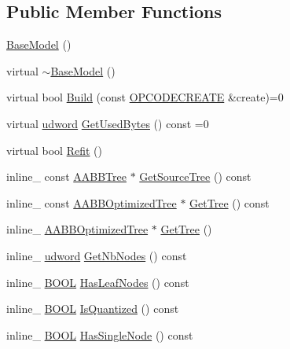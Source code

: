 \subsection*{Public Member Functions}
\begin{DoxyCompactItemize}
\item 
\hyperlink{classOpcode_1_1BaseModel_a8e9c9d6d5ff39a7db2788affdd2c9de2}{Base\+Model} ()
\item 
virtual \hyperlink{classOpcode_1_1BaseModel_a772199c091da3e8afc6a2715b564847c}{$\sim$\+Base\+Model} ()
\item 
virtual bool \hyperlink{classOpcode_1_1BaseModel_aa6d81288c9a60ffb1866d60ef2af3c2d}{Build} (const \hyperlink{structOpcode_1_1OPCODECREATE}{O\+P\+C\+O\+D\+E\+C\+R\+E\+A\+TE} \&create)=0
\item 
virtual \hyperlink{IceTypes_8h_a44c6f1920ba5551225fb534f9d1a1733}{udword} \hyperlink{classOpcode_1_1BaseModel_a98e9f8effab91a773edb478347acdb54}{Get\+Used\+Bytes} () const =0
\item 
virtual bool \hyperlink{classOpcode_1_1BaseModel_a930a22828bbcab033ac73d2e2ead3ba4}{Refit} ()
\item 
inline\+\_\+ const \hyperlink{classOpcode_1_1AABBTree}{A\+A\+B\+B\+Tree} $\ast$ \hyperlink{classOpcode_1_1BaseModel_a1ea8852b942c9922dbe49d7433484541}{Get\+Source\+Tree} () const 
\item 
inline\+\_\+ const \hyperlink{classOpcode_1_1AABBOptimizedTree}{A\+A\+B\+B\+Optimized\+Tree} $\ast$ \hyperlink{classOpcode_1_1BaseModel_ab236b5e21e1f9c8d4fa32cd3b1aa6200}{Get\+Tree} () const 
\item 
inline\+\_\+ \hyperlink{classOpcode_1_1AABBOptimizedTree}{A\+A\+B\+B\+Optimized\+Tree} $\ast$ \hyperlink{classOpcode_1_1BaseModel_a0ea824d97d9c8e22d0969c407702489e}{Get\+Tree} ()
\item 
inline\+\_\+ \hyperlink{IceTypes_8h_a44c6f1920ba5551225fb534f9d1a1733}{udword} \hyperlink{classOpcode_1_1BaseModel_acf9f894d8f22ae06f770395c82b24751}{Get\+Nb\+Nodes} () const 
\item 
inline\+\_\+ \hyperlink{IceTypes_8h_a050c65e107f0c828f856a231f4b4e788}{B\+O\+OL} \hyperlink{classOpcode_1_1BaseModel_abd682151037c748ea40a9253b6d6248e}{Has\+Leaf\+Nodes} () const 
\item 
inline\+\_\+ \hyperlink{IceTypes_8h_a050c65e107f0c828f856a231f4b4e788}{B\+O\+OL} \hyperlink{classOpcode_1_1BaseModel_aef68c14a6eaf69ca79f9ae38ee43de3d}{Is\+Quantized} () const 
\item 
inline\+\_\+ \hyperlink{IceTypes_8h_a050c65e107f0c828f856a231f4b4e788}{B\+O\+OL} \hyperlink{classOpcode_1_1BaseModel_ad4cb563ad2761d9bacaf7615eb3edde3}{Has\+Single\+Node} () const 

\end{DoxyCompactItemize}
